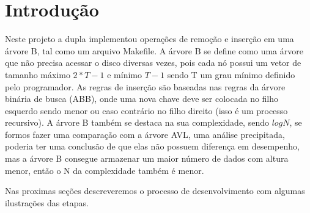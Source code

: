 \section{Introdução}

Neste projeto a dupla implementou operações de remoção e inserção em uma árvore B, tal como um arquivo Makefile. A árvore B se define como uma árvore que não precisa acessar o disco diversas vezes, pois cada nó possui um vetor de tamanho máximo $2*T-1$ e mínimo $T-1$ sendo T um grau mínimo definido pelo programador. As regras de inserção são baseadas nas regras da árvore binária de busca (ABB), onde uma nova chave deve ser colocada no filho esquerdo sendo menor ou caso contrário no filho direito (isso é um processo recursivo). A árvore B também se destaca na sua complexidade, sendo $log N$, se formos fazer uma comparação com a árvore AVL, uma análise precipitada, poderia ter uma conclusão de que elas não possuem diferença em desempenho, mas a árvore B consegue armazenar um maior número de dados com altura menor, então o N da complexidade também é menor.
\par Nas proximas seções descreveremos o processo de desenvolvimento com algumas ilustrações das etapas.